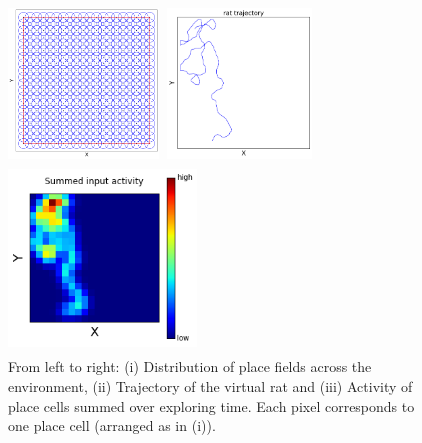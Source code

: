 \documentclass[a4paper, 12pt]{article}
\begin{document}
\begin{figure}[h]\label{input}
\setlength{\abovecaptionskip}{5pt}
\setlength{\belowcaptionskip}{0pt}
\begin{minipage}[t]{0.3\textwidth}\vspace{0pt}
\includegraphics[width=4cm, height=4cm]{pics/place_cell_locations}
\end{minipage}\hfill%
\begin{minipage}[t]{0.3\textwidth}\vspace{0pt}
\includegraphics[width=4cm, height=4cm]{pics/mouse_demo}
\end{minipage}\hfill
\begin{minipage}[t]{0.3\textwidth}\vspace{0pt}
\includegraphics[width=5cm, height=5cm]{pics/activity_demo}
\end{minipage}
\caption{\footnotesize{From left to right: (i) Distribution of place fields across the environment, (ii) Trajectory of the virtual rat and (iii) Activity of place cells summed over exploring time. Each pixel corresponds to one place cell (arranged as in (i)).}}
\end{figure}
\newpage
%
%
%	
\end{document}
